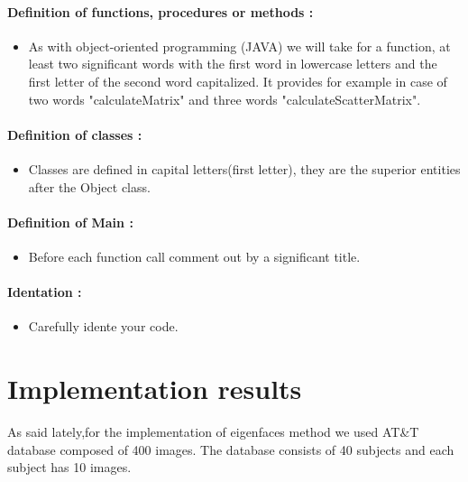 \paragraph{Definition of functions, procedures or methods :} 
\begin{itemize}
\item As with object-oriented programming (JAVA) we will take for a function, at least two significant words with the first word in lowercase letters and the first letter of the second word capitalized. It provides for example in case of two words "calculateMatrix" and three words "calculateScatterMatrix".
\end{itemize}


\paragraph{Definition of classes :} 
\begin{itemize}
\item Classes are defined in capital letters(first letter), they are the superior entities after the Object class.
\end{itemize}

\paragraph{Definition of Main :} 
\begin{itemize}
\item Before each function call comment out by a significant title.
\end{itemize} 

\paragraph{Identation :} 
\begin{itemize}
\item Carefully idente your code.
\end{itemize} 

\section{Implementation results}
As said lately,for the implementation of eigenfaces method we used AT\&T database  composed of 400 images. The database consists of 40 subjects and each subject has 10 images.


